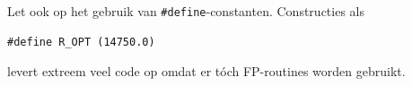 \documentclass[12pt,a4paper,final,twoside,fleqn]{article}
\def\lstC{\lstinline[style=C]}
\begin{document}
Let ook op het gebruik van \lstC{#define}-constanten. Constructies als

\begin{lstlisting}[style=C,numbers=none,belowcaptionskip=-12pt]
#define R_OPT (14750.0)
\end{lstlisting}

levert extreem veel code op omdat er t\'{o}ch FP-routines worden gebruikt.



%
%
\newpage
{}
\printbibliography{}
 
\printindex
\end{document}
